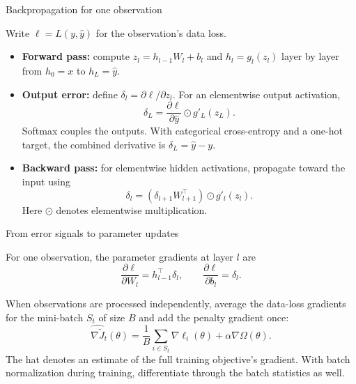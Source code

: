 \documentclass[10pt]{beamer}
\begin{document}
\begin{frame}{Backpropagation for one observation}

Write $\ell=L(y,\hat y)$ for the observation's data loss.
\begin{itemize}
\item \textbf{Forward pass:} compute $z_l=h_{l-1}W_l+b_l$ and $h_l=g_l(z_l)$ layer by layer from $h_0=x$ to $h_L=\hat y$.
\item \textbf{Output error:} define $\delta_l=\partial\ell/\partial z_l$.
For an elementwise output activation,
\[
\delta_L = \frac{\partial \ell}{\partial\hat y}\odot g'_L(z_L).
\]
Softmax couples the outputs. With categorical cross-entropy and a one-hot target, the combined derivative is $\delta_L=\hat y-y$.
\item \textbf{Backward pass:} for elementwise hidden activations, propagate toward the input using
\[
\delta_l=(\delta_{l+1}W_{l+1}^\top)\odot g'_l(z_l).
\]
Here $\odot$ denotes elementwise multiplication.
\end{itemize}

\end{frame}

\begin{frame}{From error signals to parameter updates}

For one observation, the parameter gradients at layer $l$ are
\[
\frac{\partial\ell}{\partial W_l}=h_{l-1}^\top\delta_l,
\qquad
\frac{\partial\ell}{\partial b_l}=\delta_l.
\]

When observations are processed independently, average the data-loss gradients
for the mini-batch $S_t$ of size $B$ and
add the penalty gradient once:
\[
\widehat{\nabla \tilde J}_t(\theta)
=\frac{1}{B}\sum_{i\in S_t}\nabla\ell_i(\theta)
+\alpha\nabla\Omega(\theta).
\]
The hat denotes an estimate of the full training objective's gradient.
With batch normalization during training, differentiate through the batch statistics as well.

\end{frame}
\end{document}
